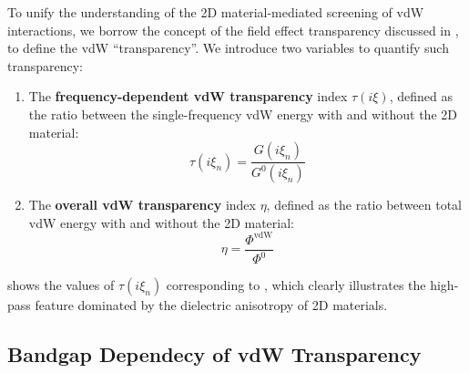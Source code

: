 To unify the understanding of the 2D material-mediated screening of
vdW interactions, we borrow the concept of the field effect
transparency  discussed in
, to define the vdW ``transparency''.
%
We introduce two variables to quantify such transparency:
\begin{enumerate}
\item The \textbf{frequency-dependent vdW transparency} index $\tau(i\xi)$,
  defined as the ratio between the single-frequency vdW energy with
  and without the 2D material:
  \begin{equation*}
  \label{eq:vdw-def-tau}
  \tau(i \xi_{n}) = \frac{G(i \xi_{n})}{G^{0}(i\xi_{n})}
\end{equation*}

\item The \textbf{overall vdW transparency} index $\eta$, defined as
  the ratio between total vdW energy with and without the 2D material:
  \begin{equation*}
\label{eq:vdw-def-total-trans}
\eta = \frac{\Phi^{\mathrm{vdW}}}{\Phi^{0}}
\end{equation*}
\end{enumerate}
%
 shows the values of $\tau(i \xi_{n})$
corresponding to , which clearly illustrates the
high-pass feature dominated by the dielectric anisotropy of 2D materials.

\subsection{Bandgap Dependecy of vdW Transparency}
\label{sec:bandg-depend-vdw}

